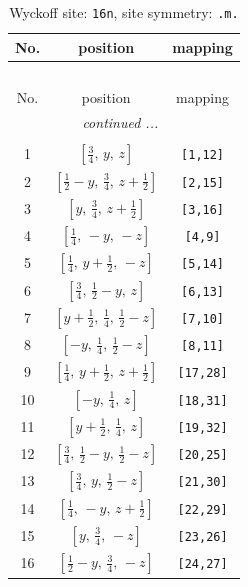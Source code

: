 \documentclass[fleqn,8pt]{jsarticle}
\begin{document}
\renewcommand{\arraystretch}{1.2}
\begin{longtable}{ccc}
\caption{Wyckoff site: {\tt 16n}, site symmetry: {\tt .m.}}
 \\
 \hline \hline
No. & position & mapping \\ \hline \endfirsthead

\multicolumn{2}{l}{\tablename\ \thetable{}} \\
 \hline \hline
No. & position & mapping \\ \hline \endhead

 \hline \hline
\multicolumn{2}{r}{\footnotesize\it continued ...} \\ \endfoot

 \hline \hline
\multicolumn{2}{r}{} \\ \endlastfoot

1 & $\left[ \frac{3}{4},\, y,\, z \right]$ & {\tt [1,12]} \\ \hline
2 & $\left[ \frac{1}{2} - y,\, \frac{3}{4},\, z + \frac{1}{2} \right]$ & {\tt [2,15]} \\ \hline
3 & $\left[ y,\, \frac{3}{4},\, z + \frac{1}{2} \right]$ & {\tt [3,16]} \\ \hline
4 & $\left[ \frac{1}{4},\, - y,\, - z \right]$ & {\tt [4,9]} \\ \hline
5 & $\left[ \frac{1}{4},\, y + \frac{1}{2},\, - z \right]$ & {\tt [5,14]} \\ \hline
6 & $\left[ \frac{3}{4},\, \frac{1}{2} - y,\, z \right]$ & {\tt [6,13]} \\ \hline
7 & $\left[ y + \frac{1}{2},\, \frac{1}{4},\, \frac{1}{2} - z \right]$ & {\tt [7,10]} \\ \hline
8 & $\left[ - y,\, \frac{1}{4},\, \frac{1}{2} - z \right]$ & {\tt [8,11]} \\ \hline
9 & $\left[ \frac{1}{4},\, y + \frac{1}{2},\, z + \frac{1}{2} \right]$ & {\tt [17,28]} \\ \hline
10 & $\left[ - y,\, \frac{1}{4},\, z \right]$ & {\tt [18,31]} \\ \hline
11 & $\left[ y + \frac{1}{2},\, \frac{1}{4},\, z \right]$ & {\tt [19,32]} \\ \hline
12 & $\left[ \frac{3}{4},\, \frac{1}{2} - y,\, \frac{1}{2} - z \right]$ & {\tt [20,25]} \\ \hline
13 & $\left[ \frac{3}{4},\, y,\, \frac{1}{2} - z \right]$ & {\tt [21,30]} \\ \hline
14 & $\left[ \frac{1}{4},\, - y,\, z + \frac{1}{2} \right]$ & {\tt [22,29]} \\ \hline
15 & $\left[ y,\, \frac{3}{4},\, - z \right]$ & {\tt [23,26]} \\ \hline
16 & $\left[ \frac{1}{2} - y,\, \frac{3}{4},\, - z \right]$ & {\tt [24,27]} \\
\end{longtable}
\end{document}
